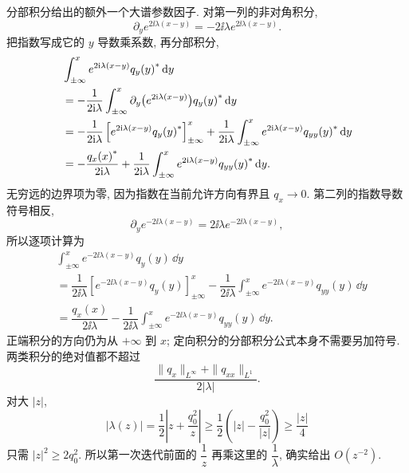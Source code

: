 \par\smallskip\noindent 分部积分给出的额外一个大谱参数因子.\quad
对第一列的非对角积分,
\begin{equation*}
\partial_y e^{2\ii\lambda(x-y)}
=-2\ii\lambda e^{2\ii\lambda(x-y)}.
\end{equation*}
把指数写成它的 $y$ 导数乘系数, 再分部积分,
\begin{align*}
&\int_{\pm\infty}^{x}e^{2\mathrm{i}\lambda(x-y)}{q_y(y)}^{*}\,\mathrm{d} y\\
&=-\dfrac{1}{2\mathrm{i}\lambda}
\int_{\pm\infty}^{x}\partial_y\bigl(e^{2\mathrm{i}\lambda(x-y)}\bigr)
{q_y(y)}^{*}\,\mathrm{d} y\\
&=-\dfrac{1}{2\mathrm{i}\lambda}
\left[e^{2\mathrm{i}\lambda(x-y)}{q_y(y)}^{*}\right]_{\pm\infty}^{x}
+\dfrac{1}{2\mathrm{i}\lambda}
\int_{\pm\infty}^{x}e^{2\mathrm{i}\lambda(x-y)}{q_{yy}(y)}^{*}\,\mathrm{d} y\\
&=-\dfrac{{q_x(x)}^{*}}{2\mathrm{i}\lambda}
+\dfrac{1}{2\mathrm{i}\lambda}
\int_{\pm\infty}^{x}e^{2\mathrm{i}\lambda(x-y)}{q_{yy}(y)}^{*}\,\mathrm{d} y.
\end{align*}
无穷远的边界项为零, 因为指数在当前允许方向有界且 $q_x\to0$.
第二列的指数导数符号相反,
\begin{equation*}
\partial_y e^{-2\ii\lambda(x-y)}
=2\ii\lambda e^{-2\ii\lambda(x-y)},
\end{equation*}
所以逐项计算为
\begin{align*}
&\int_{\pm\infty}^{x}e^{-2\ii\lambda(x-y)}q_y(y)\,\dd y\\
&=\dfrac{1}{2\ii\lambda}
\left[e^{-2\ii\lambda(x-y)}q_y(y)\right]_{\pm\infty}^{x}
-\dfrac{1}{2\ii\lambda}
\int_{\pm\infty}^{x}e^{-2\ii\lambda(x-y)}q_{yy}(y)\,\dd y\\
&=\dfrac{q_x(x)}{2\ii\lambda}
-\dfrac{1}{2\ii\lambda}
\int_{\pm\infty}^{x}e^{-2\ii\lambda(x-y)}q_{yy}(y)\,\dd y.
\end{align*}
正端积分的方向仍为从 $+\infty$ 到 $x$;
定向积分的分部积分公式本身不需要另加符号.
两类积分的绝对值都不超过
\begin{equation*}
\dfrac{\|q_x\|_{L^\infty}+\|q_{xx}\|_{L^1}}{2|\lambda|}.
\end{equation*}
对大 $|z|$,
\begin{equation*}
|\lambda(z)|
=\dfrac{1}{2}\left|z+\dfrac{q_0^2}{z}\right|
\ge\dfrac{1}{2}\left(|z|-\dfrac{q_0^2}{|z|}\right)
\ge\dfrac{|z|}{4}
\end{equation*}
只需 $|z|^2\ge2q_0^2$.
所以第一次迭代前面的 $\dfrac{1}{z}$ 再乘这里的 $\dfrac{1}{\lambda}$,
确实给出 $O(z^{-2})$.

